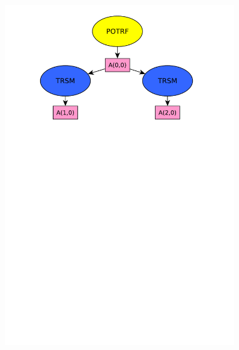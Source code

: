 \documentclass[xcolor={usenames,dvipsnames,svgnames,table}, aspectratio=43]{beamer}
\begin{document}
\begin{frame}[fragile]
\begin{minipage}[t]{0.46\linewidth}
\begin{figure}
{    \includegraphics[width=0.9\textwidth]{graph/anim-dag/anim-2.pdf}%
  }%
\end{figure}
\end{minipage}
\end{frame}
\end{document}
